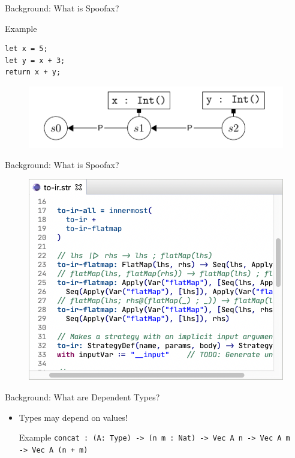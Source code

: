 \documentclass[aspectratio=43]{beamer}
\begin{document}
\begin{frame}[fragile]{Background: What is Spoofax?}

\begin{exampleblock}{Example}
\begin{lstlisting}
let x = 5;
let y = x + 3;
return x + y;
\end{lstlisting}
\end{exampleblock}

\begin{figure}
	\includegraphics[width=0.7\linewidth]{img/screenshot005}
\end{figure}


\end{frame}

\begin{frame}[fragile]{Background: What is Spoofax?}
	\begin{figure}
		\includegraphics[width=0.8\linewidth]{img/transformation}
	\end{figure}
\end{frame}

\begin{frame}[fragile]{Background: What are Dependent Types?}
\begin{itemize}
	\item Types may depend on values!
	\begin{exampleblock}{Example}
		\texttt{concat : (A: Type) -> (n m : Nat) -> Vec A n -> Vec A m
			\\ \hspace*{48pt} -> Vec A (n + m)}
	\end{exampleblock}
\end{itemize}
\end{frame}
\end{document}
